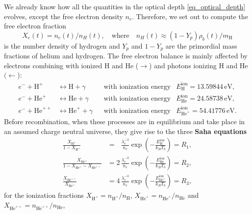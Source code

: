 \documentclass[10pt,a4paper]{article}
\begin{document}
We already know how all the quantities in the optical depth \eqref{eq_optical_depth} evolves, except the free electron density $n_e$.
Therefore, we set out to compute the free electron fraction
\begin{equation}
	X_e(t) = n_e(t) / n_H(t),
	\quad \text{where} \quad n_H(t) \approx (1-Y_p) \rho_b(t) / m_\text{H}
\label{eq_free_electron_fraction_definition}
\end{equation}
is the number density of hydrogen and
$Y_p$ and $1-Y_p$ are the primordial mass fractions of helium and hydrogen.
The free electron balance is mainly affected by
electrons combining with ionized H and He ($\rightarrow$)
and photons ionizing H and He $(\leftarrow$):
\begin{subequations}
\begin{align}
	e^- + \text{H}^+ &\leftrightarrow \text{H} + \gamma && \text{with ionization energy} & E_\text{H}^\text{ion} = 13.59844\,\mathrm{eV}, \\
	e^- + \text{He}^+ &\leftrightarrow \text{He} + \gamma && \text{with ionization energy} & E_\text{He}^\text{ion} = 24.58738\,\mathrm{eV}, \\
	e^- + \text{He}^{++} &\leftrightarrow \text{He}^+ + \gamma && \text{with ionization energy} & E_{\text{He}^+}^\text{ion} = 54.41776\,\mathrm{eV}.
\end{align}%
\label{eq_recombinations}%
\end{subequations}%
Before recombination, when these processes are in equilibrium and take place in an assumed charge neutral universe,
they give rise to the three \textbf{Saha equations}
\newcommand{\XHp}{X_{\text{H}^+}}
\newcommand{\XHep}{X_{\text{He}^+}}
\newcommand{\XHepp}{X_{\text{He}^{++}}}
\begin{subequations}
\begin{align}
    \frac{\XHp}{1-\XHp} &= \phantom{1} \, \frac{\lambda_e^{-3}}{n_e} \exp\left(-\frac{E^\text{ion}_\text{H}}{k_B T_b}\right) = R_1, \\
    \frac{\XHep}{1 - \XHep - \XHepp} &= 2 \, \frac{\lambda_e^{-3}}{n_e} \exp \left(-\frac{E^\text{ion}_\text{He}}{k_B T_b} \right) = R_2, \\
    \frac{\XHepp}{\XHep} &= 4 \, \frac{\lambda_e^{-3}}{n_e} \exp\left(-\frac{E^\text{ion}_{\text{He}^+}}{k_B T_b}\right) = R_3,
\end{align}%
\label{eq_saha_H_He}%
\end{subequations}%
for the ionization fractions $\XHp = n_{\text{H}^+} / n_\text{H}$, $\XHep = n_{\text{He}^+} / n_\text{He}$ and $\XHepp = n_{\text{He}^{++}} / n_\text{He}$,
\end{document}
